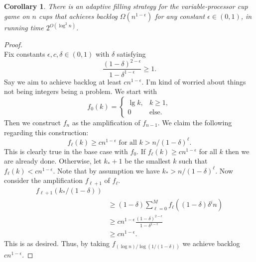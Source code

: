 \documentclass[twocolumn]{article}[11pt]
\newtheorem{corollary}{Corollary}
\begin{document}
\begin{corollary}
  \label{cor:adaptivePoly}
  There is an adaptive filling strategy for the variable-processor cup game on
  $n$ cups that achieves backlog $\Omega(n^{1-\epsilon})$ for any constant
  $\epsilon \in (0,1)$, in running time $2^{O(\log^2 n)}$.
\end{corollary}
\begin{proof}$ $\\
  Fix constants $\epsilon,c,\delta \in (0,1)$ with $\delta$
  satisfying 
  $$\frac{(1-\delta)^{2-\epsilon}}{ 1-\delta^{1-\epsilon}}\ge 1.$$
  Say we aim to achieve backlog at least $cn^{1-\epsilon}$.
  {\color{red} I'm kind of worried about things not being integers being a problem.}
  We start with 
  $$f_0(k) = 
  \begin{cases} 
    \lg k, & k\geq 1, \\
    0 & \text{else.}
  \end{cases}$$
  Then we construct $f_n$ as the amplification of $f_{n-1}$. 
  We claim the following regarding this construction:
  $$f_\ell(k) \ge cn^{1-\epsilon} \text{ for all } k>n/(1-\delta)^\ell.$$
  This is clearly true in the base case with $f_0$.
  If $f_\ell(k) \ge cn^{1-\epsilon}$ for all $k$ then we are already done.
  Otherwise, let $k_*+1$ be the smallest $k$ such that $f_\ell(k) <
  cn^{1-\epsilon}$. Note that by assumption we have $k_* > n/(1-\delta)^\ell$.
  Now consider the amplification $f_{\ell+1}$ of $f_\ell$.
  \begin{align*}
    f_{\ell+1}(k_*/(1-\delta)) &\\
    &\ge (1-\delta)\sum_{\ell=0}^M f_\ell((1-\delta)\delta^in)\\
    &\ge cn^{1-\epsilon}\frac{(1-\delta)^{2-\epsilon}}{1-\delta^{1-\epsilon}}\\
    &\ge cn^{1-\epsilon}.
  \end{align*}
  This is as desired. 
  Thus, by taking $f_{(\log n) /\log (1/(1-\delta))}$ we achieve backlog $cn^{1-\epsilon}$.


\end{proof}
\end{document}
